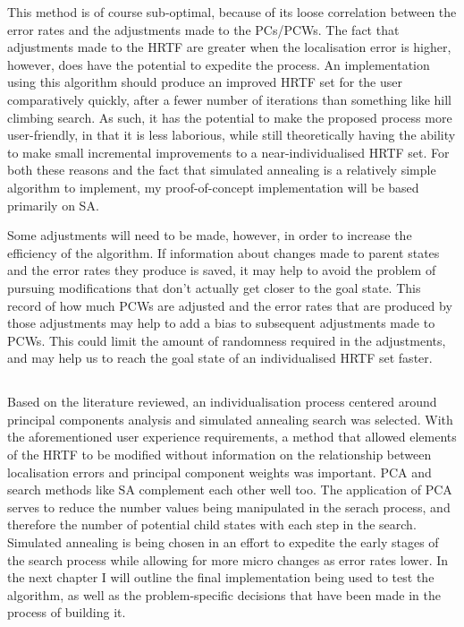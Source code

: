 This method is of course sub-optimal, because of its loose correlation between the error rates and the adjustments made to the PCs/PCWs. The fact that adjustments made to the HRTF are greater when the localisation error is higher, however, does have the potential to expedite the process. An implementation using this algorithm should produce an improved HRTF set for the user comparatively quickly, after a fewer number of iterations than something like hill climbing search. As such, it has the potential to make the proposed process more user-friendly, in that it is less laborious, while still theoretically having the ability to make small incremental improvements to a near-individualised HRTF set. For both these reasons and the fact that simulated annealing is a relatively simple algorithm to implement, my proof-of-concept implementation will be based primarily on SA.  

Some adjustments will need to be made, however, in order to increase the efficiency of the algorithm. If information about changes made to parent states and the error rates they produce is saved, it may help to avoid the problem of pursuing modifications that don't actually get closer to the goal state. This record of how much PCWs are adjusted and the error rates that are produced by those adjustments may help to add a bias to subsequent adjustments made to PCWs. This could limit the amount of randomness required in the adjustments, and may help us to reach the goal state of an individualised HRTF set faster. 

\subsection*{}
Based on the literature reviewed, an individualisation process centered around principal components analysis and simulated annealing search was selected. With the aforementioned user experience requirements, a method that allowed elements of the HRTF to be modified without information on the relationship between localisation errors and principal component weights was important. PCA and search methods like SA complement each other well too. The application of PCA serves to reduce the number values being manipulated in the serach process, and therefore the number of potential child states with each step in the search. Simulated annealing is being chosen in an effort to expedite the early stages of the search process while allowing for more micro changes as error rates lower. In the next chapter I will outline the final implementation being used to test the algorithm, as well as the problem-specific decisions that have been made in the process of building it. 
